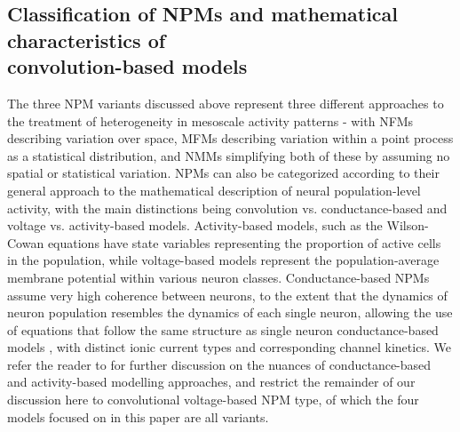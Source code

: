 \documentclass[12pt,twoside]{article}
\begin{document}
\subsection{Classification of NPMs and mathematical characteristics of \\ convolution-based models}
The three NPM variants discussed above represent three different approaches to the treatment of heterogeneity in mesoscale activity patterns - with NFMs describing variation over space, MFMs describing variation within a point process as a statistical distribution, and NMMs simplifying both of these by assuming no spatial or statistical variation. NPMs can also be categorized according to their general approach to the mathematical description of neural population-level activity, with the main distinctions being convolution vs. conductance-based and voltage vs. activity-based models. Activity-based models, such as the Wilson-Cowan equations \citep{wilson1972excitatory,cowan2016wilson} have state variables representing the proportion of active cells in the population, while voltage-based models represent the population-average membrane potential within various neuron classes. Conductance-based NPMs assume very high coherence between neurons, to the extent that the dynamics of neuron population resembles the dynamics of each single neuron, allowing the use of equations that follow the same structure as single neuron conductance-based models \citep{marreiros2010dynamic,breakspear2017dynamic}, with distinct ionic current types and corresponding channel kinetics. We refer the reader to \citet{marreiros2010dynamic, pinotsis2013conductance, moran2011vivo, moran2013neural} for further discussion on the nuances of conductance-based and activity-based modelling approaches, and restrict the remainder of our discussion here to convolutional voltage-based NPM type, of which the four models focused on in this paper are all variants.


\end{document}
